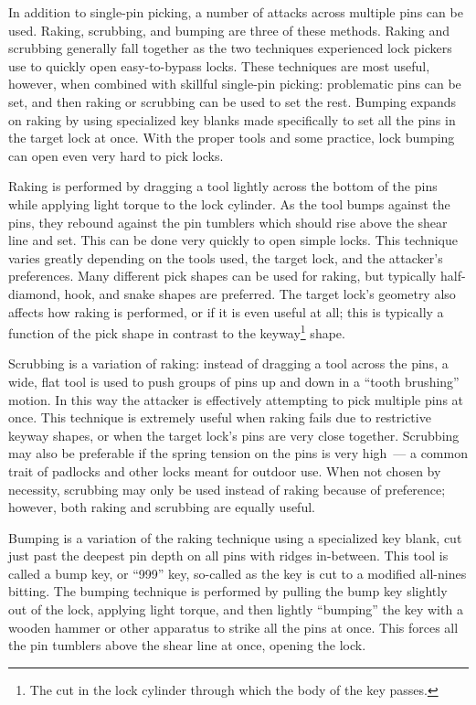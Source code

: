 \documentclass{acm_proc_article-sp}
\begin{document}
In addition to single-pin picking, a number of attacks across multiple pins can be used. Raking, scrubbing, and bumping are three of these methods. Raking and scrubbing generally fall together as the two techniques experienced lock pickers use to quickly open easy-to-bypass locks. These techniques are most useful, however, when combined with skillful single-pin picking: problematic pins can be set, and then raking or scrubbing can be used to set the rest. Bumping expands on raking by using specialized key blanks made specifically to set all the pins in the target lock at once. With the proper tools and some practice, lock bumping can open even very hard to pick locks.

Raking is performed by dragging a tool lightly across the bottom of the pins while applying light torque to the lock cylinder. As the tool bumps against the pins, they rebound against the pin tumblers which should rise above the shear line and set. This can be done very quickly to open simple locks. This technique varies greatly depending on the tools used, the target lock, and the attacker's preferences. Many different pick shapes can be used for raking, but typically half-diamond, hook, and snake shapes are preferred. The target lock's geometry also affects how raking is performed, or if it is even useful at all; this is typically a function of the pick shape in contrast to the keyway\footnote{The cut in the lock cylinder through which the body of the key passes.} shape.

Scrubbing is a variation of raking: instead of dragging a tool across the pins, a wide, flat tool is used to push groups of pins up and down in a ``tooth brushing'' motion. In this way the attacker is effectively attempting to pick multiple pins at once. This technique is extremely useful when raking fails due to restrictive keyway shapes, or when the target lock's pins are very close together. Scrubbing may also be preferable if the spring tension on the pins is very high~--- a common trait of padlocks and other locks meant for outdoor use. When not chosen by necessity, scrubbing may only be used instead of raking because of preference; however, both raking and scrubbing are equally useful.

Bumping is a variation of the raking technique using a specialized key blank, cut just past the deepest pin depth on all pins with ridges in-between. This tool is called a bump key, or ``999'' key, so-called as the key is cut to a modified all-nines bitting. The bumping technique is performed by pulling the bump key slightly out of the lock, applying light torque, and then lightly ``bumping'' the key with a wooden hammer or other apparatus to strike all the pins at once. This forces all the pin tumblers above the shear line at once, opening the lock.
\end{document}
